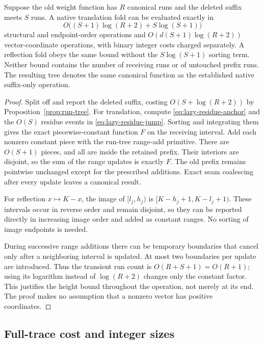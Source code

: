 \begin{theorem}
\label{thm:lazy-fold}
Suppose the old weight function has $R$ canonical runs and the deleted suffix
meets $S$ runs. A native translation fold can be evaluated exactly in
\[
 O\bigl((S+1)\log(R+2)+S\log(S+1)\bigr)
\]
structural and endpoint-order operations and
$O(d(S+1)\log(R+2))$ vector-coordinate operations, with binary integer costs
charged separately. A reflection fold obeys the same bound without the
$S\log(S+1)$ sorting term. Neither bound contains the number of receiving
runs or of untouched prefix runs. The resulting tree denotes the same
canonical function as the established native suffix-only operation.
\end{theorem}
\begin{proof}
Split off and report the deleted suffix, costing $O(S+\log(R+2))$ by
Proposition~\ref{prop:run-tree}. For translation, compute
\eqref{eq:lazy-residue-anchor} and the $O(S)$ residue events in
\eqref{eq:lazy-residue-jump}. Sorting and integrating them gives the exact
piecewise-constant function $F$ on the receiving interval. Add each nonzero
constant piece with the run-tree range-add primitive. There are $O(S+1)$
pieces, and all are inside the retained prefix. Their interiors are disjoint,
so the sum of the range updates is exactly $F$. The old prefix remains
pointwise unchanged except for the prescribed additions. Exact seam
coalescing after every update leaves a canonical result.

For reflection $x\mapsto K-x$, the image of $[l_j,h_j)$ is
$[K-h_j+1,K-l_j+1)$. These intervals occur in reverse order and remain
disjoint, so they can be reported directly in increasing image order and
added as constant ranges. No sorting of image endpoints is needed.

During successive range additions there can be temporary boundaries that
cancel only after a neighboring interval is updated. At most two boundaries
per update are introduced. Thus the transient run count is $O(R+S+1)=O(R+1)$;
using its logarithm instead of $\log(R+2)$ changes only the constant factor.
This justifies the height bound throughout the operation, not merely at its
end. The proof makes no assumption that a nonzero vector has positive
coordinates.
\end{proof}

\subsection{Full-trace cost and integer sizes}

